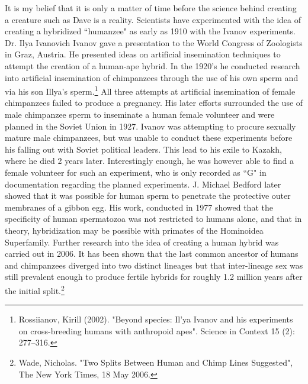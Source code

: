 \documentclass[letterpaper,10pt,twoside]{article}
\begin{document}
It is my belief that it is only a matter of time before the science behind creating a creature such as Dave is a reality.  Scientists have experimented with the idea of creating a hybridized ``humanzee" as early as 1910 with the Ivanov experiments.  Dr. Ilya Ivanovich Ivanov gave a presentation to the World Congress of Zoologists in Graz, Austria.  He presented ideas on artificial insemination techniques to attempt the creation of a human-ape hybrid.  In the 1920's he conducted research into artificial insemination of chimpanzees through the use of his own sperm and via his son Illya's sperm.\footnote{Rossiianov, Kirill (2002). "Beyond species: Il'ya Ivanov and his experiments on cross-breeding humans with anthropoid apes". Science in Context 15 (2): 277–316.}  All three attempts at artificial insemination of female chimpanzees failed to produce a pregnancy.  His later efforts surrounded the use of male chimpanzee sperm to inseminate a human female volunteer and were planned in the Soviet Union in 1927.  Ivanov was attempting to procure sexually mature male chimpanzees, but was unable to conduct these experiments before his falling out with Soviet political leaders. This lead to his exile to Kazakh, where he died 2 years later.  Interestingly enough, he was however able to find a female volunteer for such an experiment, who is only recorded as ``G" in documentation regarding the planned experiments.  J. Michael Bedford later showed that it was possible for human sperm to penetrate the protective outer membranes of a gibbon egg.  His work, conducted in 1977 showed that the specificity of human spermatozoa was not restricted to humans alone, and that in theory, hybridization may be possible with primates of the Hominoidea Superfamily.    Further research into the idea of creating a human hybrid was carried out in 2006.  It has been shown that the last common ancestor of humans and chimpanzees diverged  into two distinct lineages but that inter-lineage sex was still prevalent enough to produce fertile hybrids for roughly 1.2 million years after the initial split.\footnote{Wade, Nicholas. "Two Splits Between Human and Chimp Lines Suggested", The New York Times, 18 May 2006.}
\end{document}
